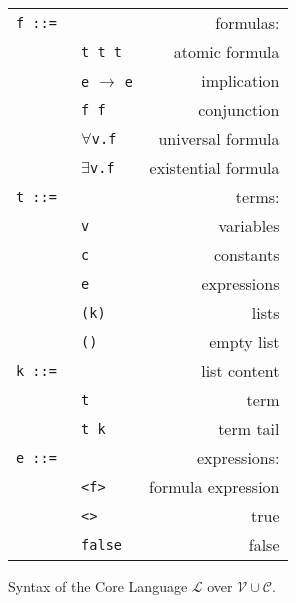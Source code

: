 \begin{figure}
\centering \small
\begin{tabular}{llr}
\hline
\texttt{f ::= } & &                   formulas:\\  
    &  \texttt{t t t}&                atomic formula\\
    &  \texttt{e} $\rightarrow$ \texttt{e}& implication\\
    &  \texttt{f f} &                 conjunction\\
    &  \(\forall\)\texttt{v.f}     & universal formula\\
    &  \(\exists\)\texttt{v.f}     & existential formula\\
\texttt{t ::=}&&                    terms:\\
      & \texttt{v}\hspace{0.3\textwidth} &                variables\\
      & \texttt{c} &                constants\\
      & \texttt{e} &                 expressions\\
      & \texttt{(k)}& lists\\
      & \texttt{()}& empty list\\
\texttt{k ::=}&&                    list content\\  
       &\texttt{t}  &term\\
       &\texttt{t k}&term tail\\
\texttt{e ::=}&&                    expressions:\\
       &\texttt{<f>} &               formula expression\\
       &\texttt{<>} & true\\
       &\texttt{false}       &               false\\
    \hline
\end{tabular}
\caption{Syntax of the \nthree Core Language $\mathcal{L}$ over $\mathcal{V}\cup\mathcal{C}$.\label{syntax}}
\end{figure}

